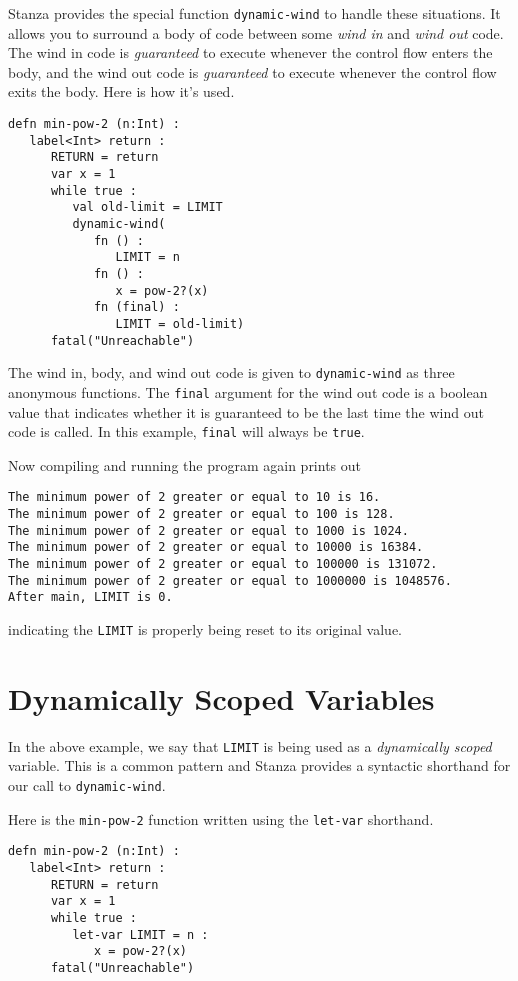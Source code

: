 \documentclass[10pt,oneside]{book}
\begin{document}
Stanza provides the special function \texttt{\frenchspacing dynamic-wind} to handle these situations. It allows you to surround a body of code between some {\em wind in} and {\em wind out} code. The wind in code is {\em guaranteed} to execute whenever the control flow enters the body, and the wind out code is {\em guaranteed} to execute whenever the control flow exits the body. Here is how it's used.
\begin{lstlisting}
defn min-pow-2 (n:Int) :
   label<Int> return :
      RETURN = return      
      var x = 1
      while true :
         val old-limit = LIMIT
         dynamic-wind(
            fn () :
               LIMIT = n
            fn () :   
               x = pow-2?(x)
            fn (final) :            
               LIMIT = old-limit)
      fatal("Unreachable")
\end{lstlisting}
The wind in, body, and wind out code is given to \texttt{\frenchspacing dynamic-wind} as three anonymous functions. The \texttt{\frenchspacing final} argument for the wind out code is a boolean value that indicates whether it is guaranteed to be the last time the wind out code is called. In this example, \texttt{\frenchspacing final} will always be \texttt{\frenchspacing true}. 

Now compiling and running the program again prints out
\begin{lstlisting}
The minimum power of 2 greater or equal to 10 is 16.
The minimum power of 2 greater or equal to 100 is 128.
The minimum power of 2 greater or equal to 1000 is 1024.
The minimum power of 2 greater or equal to 10000 is 16384.
The minimum power of 2 greater or equal to 100000 is 131072.
The minimum power of 2 greater or equal to 1000000 is 1048576.
After main, LIMIT is 0.
\end{lstlisting}
indicating the \texttt{\frenchspacing LIMIT} is properly being reset to its original value.

\section{Dynamically Scoped Variables}
In the above example, we say that \texttt{\frenchspacing LIMIT} is being used as a {\em dynamically scoped} variable. This is a common pattern and Stanza provides a syntactic shorthand for our call to \texttt{\frenchspacing dynamic-wind}.

Here is the \texttt{\frenchspacing min-pow-2} function written using the \texttt{\frenchspacing let-var} shorthand.
\begin{lstlisting}
defn min-pow-2 (n:Int) :
   label<Int> return :
      RETURN = return      
      var x = 1
      while true :
         let-var LIMIT = n :
            x = pow-2?(x)
      fatal("Unreachable")
\end{lstlisting}
\end{document}
